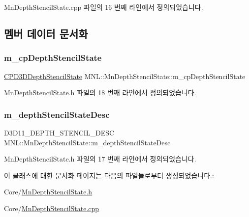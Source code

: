 Mn\+Depth\+Stencil\+State.\+cpp 파일의 16 번째 라인에서 정의되었습니다.



\subsection{멤버 데이터 문서화}
\mbox{\label{class_m_n_l_1_1_mn_depth_stencil_state_a23bb91aaa4077752afe743a2385a04bc}} 
\subsubsection{\texorpdfstring{m\+\_\+cp\+Depth\+Stencil\+State}{m\_cpDepthStencilState}}
{\footnotesize\ttfamily \hyperlink{namespace_m_n_l_a8209b06065c025e5d6bc2e8ee5925faf}{C\+P\+D3\+D\+Depth\+Stencil\+State} M\+N\+L\+::\+Mn\+Depth\+Stencil\+State\+::m\+\_\+cp\+Depth\+Stencil\+State\hspace{0.3cm}{\ttfamily [private]}}



Mn\+Depth\+Stencil\+State.\+h 파일의 18 번째 라인에서 정의되었습니다.

\mbox{\label{class_m_n_l_1_1_mn_depth_stencil_state_a1d4dc90b80e4f447f6a64a8cfcd53c72}} 
\subsubsection{\texorpdfstring{m\+\_\+depth\+Stencil\+State\+Desc}{m\_depthStencilStateDesc}}
{\footnotesize\ttfamily D3\+D11\+\_\+\+D\+E\+P\+T\+H\+\_\+\+S\+T\+E\+N\+C\+I\+L\+\_\+\+D\+E\+SC M\+N\+L\+::\+Mn\+Depth\+Stencil\+State\+::m\+\_\+depth\+Stencil\+State\+Desc\hspace{0.3cm}{\ttfamily [private]}}



Mn\+Depth\+Stencil\+State.\+h 파일의 17 번째 라인에서 정의되었습니다.



이 클래스에 대한 문서화 페이지는 다음의 파일들로부터 생성되었습니다.\+:\begin{DoxyCompactItemize}
\item 
Core/\hyperlink{_mn_depth_stencil_state_8h}{Mn\+Depth\+Stencil\+State.\+h}\item 
Core/\hyperlink{_mn_depth_stencil_state_8cpp}{Mn\+Depth\+Stencil\+State.\+cpp}\end{DoxyCompactItemize}
